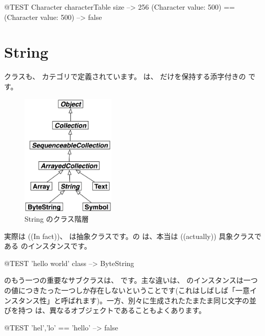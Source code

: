\documentclass[a4paper,10pt,twoside]{book}
\begin{document}
\begin{code}{@TEST}
Character characterTable size                               --> 256
(Character value: 500) == (Character value: 500) --> false
\end{code}

\section{String}

 クラスも、 カテゴリで定義されています。 は、 だけを保持する添字付きの  です。

\begin{figure}[ht]
  {\centerline {\includegraphics[width=0.4\textwidth]{StringHierarchy}}}
\caption{String のクラス階層 }
\end{figure}

実際は ((In fact))、 は抽象クラスです。\pharo の  は、本当は ((actually)) 具象クラスである  のインスタンスです。

\begin{code}{@TEST}
'hello world' class --> ByteString
\end{code}

 のもう一つの重要なサブクラスは、 です。主な違いは、 のインスタンスは一つの値につきたった一つしか存在しないということです(これはしばしば「一意インスタンス性」と呼ばれます)。一方、別々に生成されたたまたま同じ文字の並びを持つ  は、異なるオブジェクトであることもよくあります。

\begin{code}{@TEST}
'hel','lo' == 'hello' --> false
\end{code}
\end{document}
